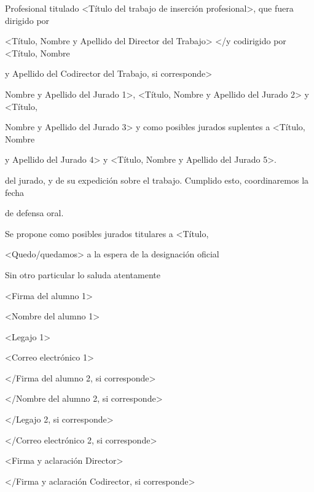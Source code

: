\documentclass[a4paper,12pt]{article}
\begin{document}
Profesional titulado <Título del trabajo de inserción profesional>, que fuera dirigido por

<Título, Nombre y Apellido del Director del Trabajo> </y codirigido por <Título, Nombre

y Apellido del Codirector del Trabajo, si corresponde>

Nombre y Apellido del Jurado 1>, <Título, Nombre y Apellido del Jurado 2> y <Título,

Nombre y Apellido del Jurado 3> y como posibles jurados suplentes a <Título, Nombre

y Apellido del Jurado 4> y <Título, Nombre y Apellido del Jurado 5>.

del jurado, y de su expedición sobre el trabajo. Cumplido esto, coordinaremos la fecha

de defensa oral.

Se propone como posibles jurados titulares a <Título,

<Quedo/quedamos> a la espera de la designación oficial

Sin otro particular lo saluda atentamente

<Firma del alumno 1>

<Nombre del alumno 1>

<Legajo 1>

<Correo electrónico 1>

</Firma del alumno 2, si corresponde>

</Nombre del alumno 2, si corresponde>

</Legajo 2, si corresponde>

</Correo electrónico 2, si corresponde>

<Firma y aclaración Director>

</Firma y aclaración Codirector, si corresponde>
\end{document}
